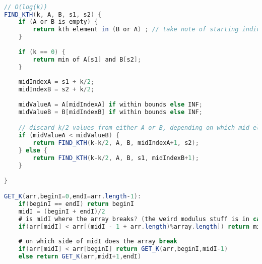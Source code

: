 \documentclass{article}
\begin{document}
\begin{lstlisting}[language=Java]

// O(log(k))
FIND_KTH(k, A, B, s1, s2) {
    if (A or B is empty) {
        return kth element in (B or A) ; // take note of starting indices s1/s2
    }
    
    if (k == 0) {
        return min of A[s1] and B[s2];
    }
    
    midIndexA = s1 + k/2;
    midIndexB = s2 + k/2;
    
    midValueA = A[midIndexA] if within bounds else INF;
    midValueB = B[midIndexB] if within bounds else INF;

    // discard k/2 values from either A or B, depending on which mid element is smaller
    if (midValueA < midValueB) {
        return FIND_KTH(k-k/2, A, B, midIndexA+1, s2);
    } else {
        return FIND_KTH(k-k/2, A, B, s1, midIndexB+1);
    }
    
}

GET_K(arr,beginI=0,endI=arr.length-1):
    if(beginI == endI) return beginI
    midI = (beginI + endI)/2
    # is midI where the array breaks? (the weird modulus stuff is in case midI = 0)
    if(arr[midI] < arr[(midI - 1 + arr.length)%array.length]) return midI
    
    # on which side of midI does the array break
    if(arr[midI] < arr[beginI] return GET_K(arr,beginI,midI-1)
    else return GET_K(arr,midI+1,endI)
\end{lstlisting}
\end{document}
